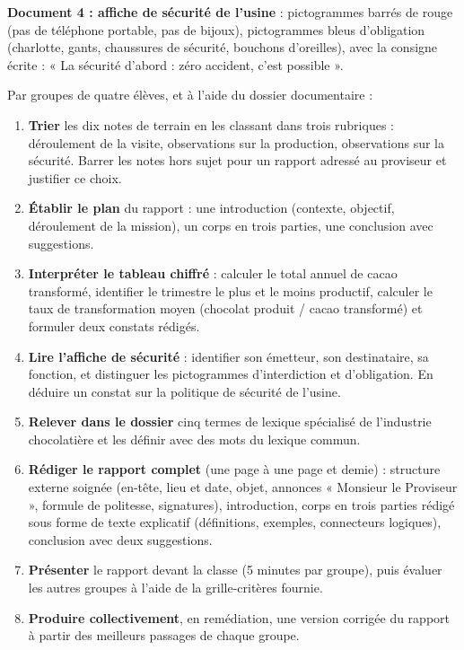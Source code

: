 \documentclass[11pt]{article}
\newcounter{popsec}
\newcounter{popsub}
\newcommand{\courssub}[1]{%
  \stepcounter{popsub}%
  \par\vspace{9pt}\noindent{\popxbold\fontsize{11.5}{13}\selectfont\color{popink}{\color{poporange}\thepopsec.\thepopsub}\hspace{6pt}#1}\par\nopagebreak\vspace{4pt}
}
\begin{document}
\textbf{Document 4 : affiche de sécurité de l'usine} : pictogrammes barrés de rouge (pas de téléphone portable, pas de bijoux), pictogrammes bleus d'obligation (charlotte, gants, chaussures de sécurité, bouchons d'oreilles), avec la consigne écrite : « La sécurité d'abord : zéro accident, c'est possible ».

\courssub{Consignes}

Par groupes de quatre élèves, et à l'aide du dossier documentaire :

\begin{enumerate}
\item \textbf{Trier} les dix notes de terrain en les classant dans trois rubriques : déroulement de la visite, observations sur la production, observations sur la sécurité. Barrer les notes hors sujet pour un rapport adressé au proviseur et justifier ce choix.
\item \textbf{Établir le plan} du rapport : une introduction (contexte, objectif, déroulement de la mission), un corps en trois parties, une conclusion avec suggestions.
\item \textbf{Interpréter le tableau chiffré} : calculer le total annuel de cacao transformé, identifier le trimestre le plus et le moins productif, calculer le taux de transformation moyen (chocolat produit / cacao transformé) et formuler deux constats rédigés.
\item \textbf{Lire l'affiche de sécurité} : identifier son émetteur, son destinataire, sa fonction, et distinguer les pictogrammes d'interdiction et d'obligation. En déduire un constat sur la politique de sécurité de l'usine.
\item \textbf{Relever dans le dossier} cinq termes de lexique spécialisé de l'industrie chocolatière et les définir avec des mots du lexique commun.
\item \textbf{Rédiger le rapport complet} (une page à une page et demie) : structure externe soignée (en-tête, lieu et date, objet, annonces « Monsieur le Proviseur », formule de politesse, signatures), introduction, corps en trois parties rédigé sous forme de texte explicatif (définitions, exemples, connecteurs logiques), conclusion avec deux suggestions.
\item \textbf{Présenter} le rapport devant la classe (5 minutes par groupe), puis évaluer les autres groupes à l'aide de la grille-critères fournie.
\item \textbf{Produire collectivement}, en remédiation, une version corrigée du rapport à partir des meilleurs passages de chaque groupe.
\end{enumerate}
\end{document}
